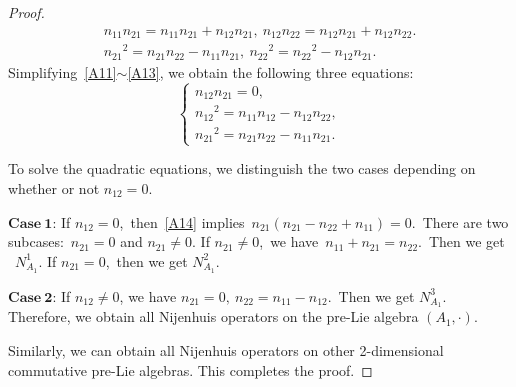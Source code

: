 \documentclass[12pt, reqno]{amsart}
\theoremstyle{plain}
\begin{document}
\begin{proof}
\begin{eqnarray}
  n_{11}n_{21}=n_{11}n_{21}+n_{12}n_{21},~n_{12}n_{22}=n_{12}n_{21}+n_{12}n_{22}\label{A12}. \\
  {n_{21}}^2 = n_{21}n_{22}-n_{11}n_{21},~{n_{22}}^2={n_{22}}^2-n_{12}n_{21}\label{A13}.
\end{eqnarray}
Simplifying~\eqref{A11}$\sim$\eqref{A13}, we obtain the following three equations:
\begin{equation}\label{A14}
\left\{\begin{array}{l}
n_{12}n_{21}=0,\\{n_{12}}^2=n_{11}n_{12}-n_{12}n_{22},\\
{n_{21}}^2=n_{21}n_{22}-n_{11}n_{21}.
\end{array}\right.
\end{equation}

To solve the quadratic equations, we distinguish the two cases depending on whether
or not $n_{12} = 0$.

$\mathbf{Case~1}$: If $n_{12}=0$,~then~\eqref{A14} implies~$n_{21}(n_{21}-n_{22}+n_{11})=0$.~There are two subcases:~$n_{21}=0$ and $n_{21}\neq0$. If $n_{21}\neq0$,~we have~$n_{11}+n_{21}=n_{22}$.~Then we get ~$N_{A_{1}}^1$.
If $n_{21}=0$,~then we get $N_{A_{1}}^2$.

$\mathbf{Case~2}$: If $n_{12}\neq0$, we have $n_{21}=0,~n_{22}=n_{11}-n_{12}$.~Then we get $N_{A_{1}}^3$.
Therefore, we obtain all Nijenhuis operators on the pre-Lie algebra $(A_1,\cdot)$.

Similarly, we can obtain all Nijenhuis operators on other 2-dimensional  commutative pre-Lie algebras. This completes the proof.
\end{proof}
\end{document}
